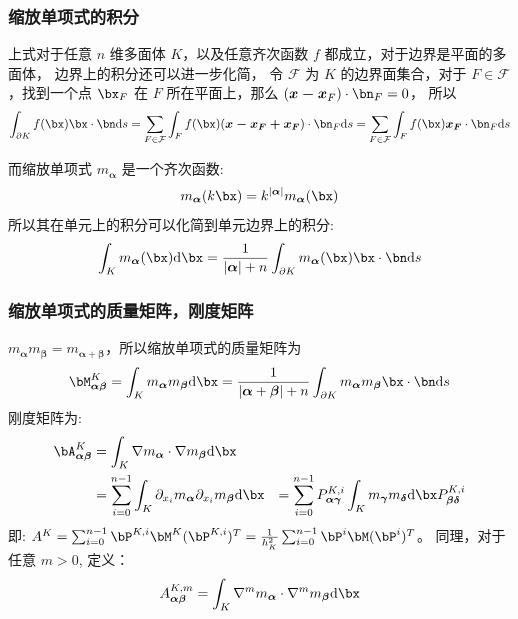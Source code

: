 \documentclass[notheorems,serif]{beamer}
\begin{document}
\begin{frame}
  \frametitle{缩放单项式的积分}
上式对于任意 $n$ 维多面体 $K$，以及任意齐次函数 $f$
都成立，对于边界是平面的多面体，
边界上的积分还可以进一步化简，
令 $\mathcal{F}$ 为 $K$ 的边界面集合，对于 $F\in \mathcal{F}$，找到一个点
$\bx_F$ 在 $F$ 所在平面上，那么 
$(\boldsymbol{x-x}_F)\cdot \bn_F = 0$，
所以
$$
\int_{\partial K} f(\bx)\bx\cdot \bn
\mathrm{d}s = \sum_{F\in \mathcal{F}}
\int_{F} f(\bx)(\boldsymbol{x-x_F+x_F})\cdot \bn_F
\mathrm{d}s = \sum_{F\in \mathcal{F}}
\int_{F} f(\bx)\boldsymbol{x_F}\cdot \bn_F
\mathrm{d}s
$$

而缩放单项式 $m_{\boldsymbol{\alpha}}$
是一个齐次函数:
$$
m_{\boldsymbol{\alpha}}(k\bx) = k^{|\boldsymbol{\alpha}|}
m_{\boldsymbol{\alpha}}(\bx)
$$
所以其在单元上的积分可以化简到单元边界上的积分:
$$
\int_K m_{\boldsymbol{\alpha}}(\bx)\mathrm{d}\bx =
\frac{1}{|\boldsymbol{\alpha}|+n} \int_{\partial K}
m_{\boldsymbol{\alpha}}(\bx)\bx\cdot \bn
\mathrm{d}s
$$
\end{frame}

\begin{frame}
    \frametitle{缩放单项式的质量矩阵，刚度矩阵}
$m_{\boldsymbol{\alpha}}m_{\boldsymbol{\beta}} =
m_{\boldsymbol{\alpha+\beta}}$，所以缩放单项式的质量矩阵为
$$
\bM^{K}_{\boldsymbol{\alpha\beta}} = \int_K
m_{\boldsymbol{\alpha}}m_{\boldsymbol{\beta}}\mathrm{d}\bx =
\frac{1}{|\boldsymbol{\alpha}+\boldsymbol{\beta}|+n} \int_{\partial K}
m_{\boldsymbol{\alpha}}m_{\boldsymbol{\beta}}\bx\cdot \bn
\mathrm{d}s
$$
刚度矩阵为:
$$
\begin{aligned}
\bA^{K}_{\boldsymbol{\alpha\beta}} & = \int_K
\nabla m_{\boldsymbol{\alpha}}\cdot \nabla
m_{\boldsymbol{\beta}}\mathrm{d}\bx\\
& = 
\sum_{i=0}^{n-1} \int_K \partial_{x_i} m_{\boldsymbol{\alpha}}
\partial_{x_i} m_{\boldsymbol{\beta}}\mathrm{d}\bx
& = \sum_{i=0}^{n-1} P^{K, i}_{\boldsymbol{\alpha\gamma}}
\int_K m_{\boldsymbol{\gamma}}m_{\boldsymbol{\delta}}\mathrm{d}\bx
P^{K, i}_{\boldsymbol{\beta\delta}}
\end{aligned}
$$
即: $A^{K} = \sum_{i=0}^{n-1} \bP^{K, i}
\bM^{K} (\bP^{K, i})^T = \frac{1}{h_K^2}
\sum_{i=0}^{n-1} \bP^{i} \bM (\bP^{i})^T$。
同理，对于任意 $m>0$, 定义：
$$
A^{K, m}_{\boldsymbol{\alpha\beta}} = \int_K \nabla^m m_{\boldsymbol{\alpha}}
\cdot \nabla^m m_{\boldsymbol{\beta}}\mathrm{d}\bx
$$
\end{frame}
\end{document}
